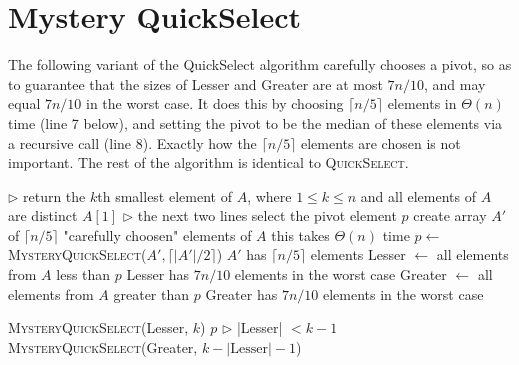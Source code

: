 \documentclass[11pt,fleqn]{exam}
\begin{document}
	
	\section{Mystery QuickSelect}
The following variant of the QuickSelect algorithm carefully chooses a pivot, so as to
guarantee that the sizes of Lesser and Greater are at most $7n/10$, and may equal $7n/10$ in the worst case.
It does this by choosing $\lceil n/5 \rceil$ elements in $\Theta(n)$ time (line 7 below), and setting the
pivot to be the median of these elements via a recursive call (line 8).
Exactly how the $\lceil n/5 \rceil$ elements are chosen is not
important.  The rest of the algorithm is identical to \textsc{QuickSelect}.

\vspace{.1in}

\begin{algorithmic}[1]
\State $\triangleright$ return the $k$th smallest element of $A$, where $1\le k \le n$ and all elements of $A$ are distinct
   \State \Return $A[1]$
\Else
   \State $\triangleright$ the next two lines select the pivot element $p$
   \State create array $A'$ of $\lceil n/5 \rceil$ "carefully choosen" elements of $A$ \Comment this takes $\Theta(n)$ time
    \State $p \gets$ \textsc{MysteryQuickSelect}($A', \lceil |A'|/2 \rceil$) \Comment $A'$ has  $\lceil n/5\rceil$ elements
    \State Lesser  $\gets$ all elements from $A$ less than $p$  \Comment Lesser has $7n/10$ elements in the worst case
    \State Greater $\gets$ all elements from $A$ greater than $p$ \Comment Greater has $7n/10$ elements in the worst case

       \State \Return \textsc{MysteryQuickSelect}(Lesser, $k$)
        \State \Return $p$
   \Else  \hspace{.2in} $\triangleright$ |Lesser| $< k-1$
       \State \Return \textsc{MysteryQuickSelect}(Greater, $k - |\mbox{Lesser}| - 1$)
   \EndIf
\EndIf
\EndFunction
\end{algorithmic}
\end{document}
